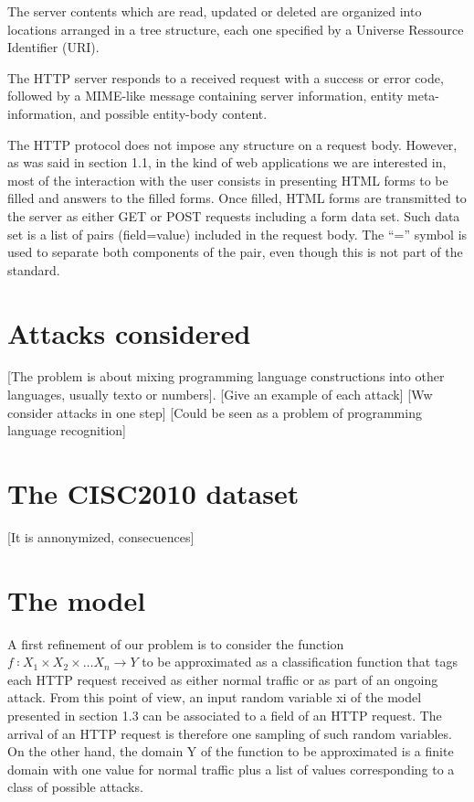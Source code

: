 \documentclass[runningheads,a4paper]{llncs}
\begin{document}
The server contents which are read, updated or deleted are organized into locations arranged in a tree structure, each one specified by a Universe Ressource Identifier (URI).

The HTTP server responds to a received request with a success or error code, followed by a MIME-like message containing server information, entity meta-information, and possible entity-body content.

The HTTP protocol does not impose any structure on a request body. However, as was said in section 1.1, in the kind of web applications we are interested in, most of the interaction with the user consists in presenting HTML forms to be filled and answers to the filled forms. Once filled, HTML forms are transmitted to the server as either GET or POST requests including a form data set. Such data set is a list of pairs (field=value) included in the request body. The “=” symbol is used to separate both components of the pair, even though this is not part of the standard.

\section{Attacks considered}

[The problem is about mixing programming language constructions into other languages, usually texto or numbers]. 
[Give an example of each attack]
[Ww consider attacks in one step]
[Could be seen as a problem of programming language recognition]

\section{The CISC2010 dataset}

[It is annonymized, consecuences]

\section{The model}

A first refinement of our problem is to consider the function $f∶X_1  \times X_2  \times\ldots X_n \rightarrow Y$ to be approximated as a classification function that tags each HTTP request received as either normal traffic or as part of an ongoing attack. From this point of view, an input random variable xi of the model presented in section 1.3 can be associated to a field of an HTTP request. The arrival of an HTTP request is therefore one sampling of such random variables. 
On the other hand, the domain Y of the function to be approximated is a finite domain with one value for normal traffic plus a list of values corresponding to a class of possible attacks. 
\end{document}
